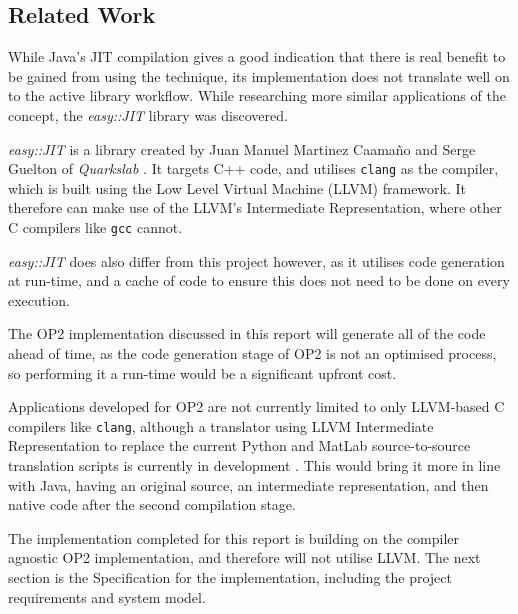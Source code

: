 \subsection{Related Work}

While Java's JIT compilation gives a good indication that there is real benefit to be gained from using the technique, its implementation does not translate well on to the active library workflow. While researching more similar applications of the concept, the \textit{easy::JIT} library was discovered.


\noindent \textit{easy::JIT} \cite{eJIT} is a library created by Juan Manuel Martinez Caamaño and Serge Guelton of \textit{Quarkslab} \cite{Quarkslab}. It targets C++ code, and utilises \verb|clang| \cite{clang} as the compiler, which is built using the Low Level Virtual Machine (LLVM) framework. It therefore can make use of the LLVM's Intermediate Representation, where other C compilers like \verb|gcc| cannot.
\par
\textit{easy::JIT} does also differ from this project however, as it utilises code generation at run-time, and a cache of code to ensure this does not need to be done on every execution.
\par The OP2 implementation discussed in this report will generate all of the code ahead of time, as the code generation stage of OP2 is not an optimised process, so performing it a run-time would be a significant upfront cost.
\par
Applications developed for OP2 are not currently limited to only LLVM-based C compilers like \verb|clang|, although a translator using LLVM Intermediate Representation to replace the current Python and MatLab source-to-source translation scripts is currently in development \cite{op2clang}. This would bring it more in line with Java, having an original source, an intermediate representation, and then native code after the second compilation stage.
\par
The implementation completed for this report is building on the compiler agnostic OP2 implementation, and therefore will not utilise LLVM. The next section is the Specification for the implementation, including the project requirements and system model.
